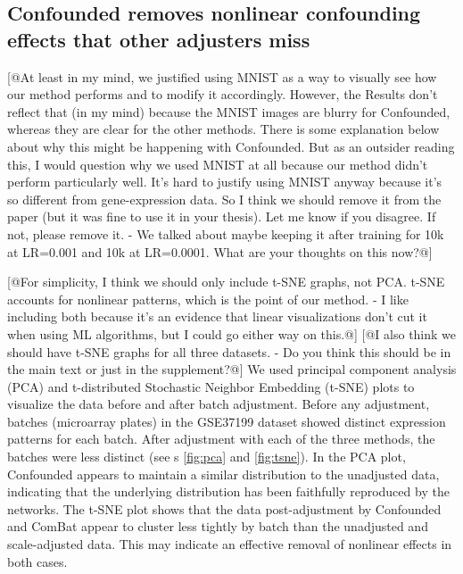 \documentclass[11pt]{article}
\begin{document}
\subsection{Confounded removes nonlinear confounding effects that other adjusters miss}

[@At least in my mind, we justified using MNIST as a way to visually see how our method performs and to modify it accordingly. However, the Results don't reflect that (in my mind) because the MNIST images are blurry for Confounded, whereas they are clear for the other methods. There is some explanation below about why this might be happening with Confounded. But as an outsider reading this, I would question why we used MNIST at all because our method didn't perform particularly well. It's hard to justify using MNIST anyway because it's so different from gene-expression data. So I think we should remove it from the paper (but it was fine to use it in your thesis). Let me know if you disagree. If not, please remove it. - We talked about maybe keeping it after training for 10k at LR=0.001 and 10k at LR=0.0001. What are your thoughts on this now?@]

[@For simplicity, I think we should only include t-SNE graphs, not PCA. t-SNE accounts for nonlinear patterns, which is the point of our method. - I like including both because it's an evidence that linear visualizations don't cut it when using ML algorithms, but I could go either way on this.@]
[@I also think we should have t-SNE graphs for all three datasets. - Do you think this should be in the main text or just in the supplement?@]
We used principal component analysis (PCA) and t-distributed Stochastic Neighbor Embedding (t-SNE) \citep{maaten_visualizing_2008} plots to visualize the data before and after batch adjustment.
Before any adjustment, batches (microarray plates) in the GSE37199 dataset showed distinct expression patterns for each batch.
After adjustment with each of the three methods, the batches were less distinct (see \figurename{s} \ref{fig:pca} and \ref{fig:tsne}).
In the PCA plot, Confounded appears to maintain a similar distribution to the unadjusted data, indicating that the underlying distribution has been faithfully reproduced by the networks.
The t-SNE plot shows that the data post-adjustment by Confounded and ComBat appear to cluster less tightly by batch than the unadjusted and scale-adjusted data.
This may indicate an effective removal of nonlinear effects in both cases.
\end{document}
